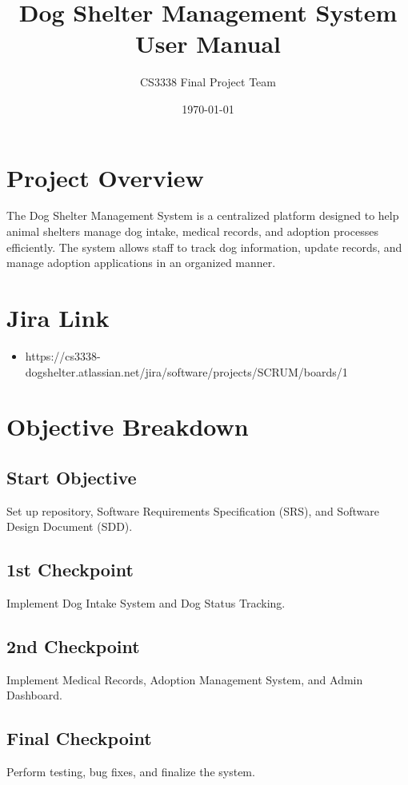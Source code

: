 \documentclass{article}
\title{Dog Shelter Management System \\ User Manual}
\author{CS3338 Final Project Team}
\date{\today}
\begin{document}
\maketitle

\section{Project Overview}
The Dog Shelter Management System is a centralized platform designed to help animal shelters manage dog intake, medical records, and adoption processes efficiently. The system allows staff to track dog information, update records, and manage adoption applications in an organized manner.

\section{Jira Link}
\begin{itemize}
    \item https://cs3338-dogshelter.atlassian.net/jira/software/projects/SCRUM/boards/1
\end{itemize}

\section{Objective Breakdown}

\subsection{Start Objective}
Set up repository, Software Requirements Specification (SRS), and Software Design Document (SDD).

\subsection{1st Checkpoint}
Implement Dog Intake System and Dog Status Tracking.

\subsection{2nd Checkpoint}
Implement Medical Records, Adoption Management System, and Admin Dashboard.

\subsection{Final Checkpoint}
Perform testing, bug fixes, and finalize the system.
\end{document}
